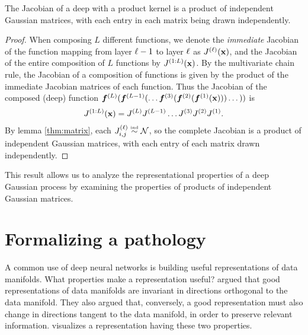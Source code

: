 \begin{theorem}
\label{thm:prodjacob}
The Jacobian of a deep \gp{} with a product kernel is a product of independent Gaussian matrices, with each entry in each matrix being drawn independently.
\end{theorem}
%
\begin{proof}
When composing $L$ different functions, we denote the \emph{immediate} Jacobian of the function mapping from layer $\ell -1$ to layer $\ell$ as $J^{(\ell)}({\bf{x}})$, and the Jacobian of the entire composition of $L$ functions by $J^{(1:L)}({\bf{x}})$.
%
By the multivariate chain rule, the Jacobian of a composition of functions is given by the product of the immediate Jacobian matrices of each function.  
%
Thus the Jacobian of the composed (deep) function $\boldsymbol{f}^{(L)}(\boldsymbol{f}^{(L-1)}(\dots \boldsymbol{f}^{(3)}( \boldsymbol{f}^{(2)}( \boldsymbol{f}^{(1)}({\bf{x}})))\dots))$ is
%
%
\begin{align}
 J^{(1:L)}({\bf{x}}) 
= J^{(L)} J^{(L-1)} \dots J^{(3)} J^{(2)} J^{(1)}.
\label{eq:jacobian-of-deep-gp}
\end{align}
%
By lemma \ref{thm:matrix}, each ${J^{(\ell)}_{i,j} \overset{\mbox{\tiny \textnormal{ind}}}{\sim} \mathcal{N}}$, so the complete Jacobian is a product of independent Gaussian matrices, with each entry of each matrix drawn independently.
\end{proof}

This result allows us to analyze the representational properties of a deep Gaussian process by examining the properties of products of independent Gaussian matrices.






\section{Formalizing a pathology}
\label{sec:formalizing-pathology}

A common use of deep neural networks is building useful representations of data manifolds.
What properties make a representation useful?
\citet{rifai2011higher} argued that good representations of data manifolds are invariant in directions orthogonal to the data manifold.
They also argued that, conversely, a good representation must also change in directions tangent to the data manifold, in order to preserve relevant information.
 visualizes a representation having these two properties.

